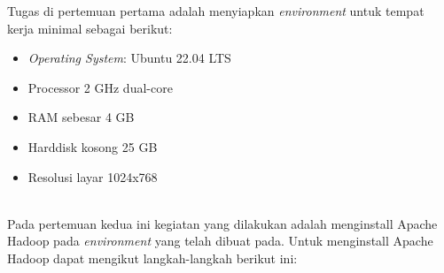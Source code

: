 \documentclass[a4paper]{tufte-handout}
\begin{document}
Tugas di pertemuan pertama adalah menyiapkan \textit{environment} untuk tempat kerja minimal sebagai berikut:
\begin{itemize}
\setlength\itemsep{0em}
\item \textit{Operating System}: Ubuntu 22.04 LTS
\item Processor 2 GHz dual-core
\item RAM sebesar 4 GB
\item Harddisk kosong 25 GB
\item Resolusi layar 1024x768
\end{itemize}
\hrulefill

\clearpage
{}

 \\
Pada pertemuan kedua ini kegiatan yang dilakukan adalah menginstall Apache Hadoop pada \textit{environment} yang telah dibuat pada. Untuk menginstall Apache Hadoop dapat mengikut langkah-langkah berikut ini:
\end{document}

